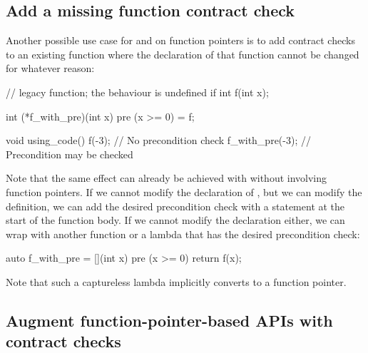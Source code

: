 
\subsection{Add a missing function contract check}
\label{usecase_addmissing}

Another possible use case for  and  on function pointers is to add contract checks to an existing function where the declaration of that function cannot be changed for whatever reason:
\begin{codeblock}
// legacy function; the behaviour is undefined if 
int f(int x);   

int (*f_with_pre)(int x) pre (x >= 0) = f; 

void using_code() {
  f(-3);          // No precondition check
  f_with_pre(-3);  // Precondition may be checked
}
\end{codeblock}

Note that the same effect can already be achieved with \cite{P2900R8} without involving function pointers. If we cannot modify the declaration of , but we can modify the definition, we can add the desired precondition check with a  statement at the start of the function body. If we cannot modify the declaration either, we can wrap  with another function or a lambda that has the desired precondition check:
\begin{codeblock}
auto f_with_pre = [](int x) pre (x >= 0) { return f(x); }
\end{codeblock}
Note that such a captureless lambda implicitly converts to a function pointer.


\subsection{Augment function-pointer-based APIs with contract checks}
\label{usecase_api}

